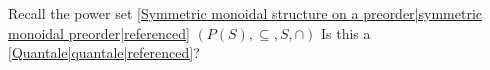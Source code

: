 
Recall the power set \ref{Symmetric monoidal structure on a preorder|symmetric monoidal preorder|referenced} $(P(S),\subseteq, S, \cap)$ Is this a \ref{Quantale|quantale|referenced}?